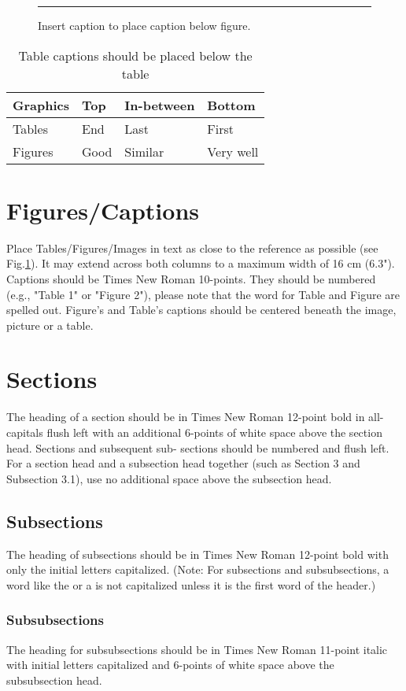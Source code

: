 \documentclass[twoside,twocolumn,10pt]{article}
\begin{document}
\begin{figure}[htb]
    \centering
    \rule{6cm}{3cm}
    \caption{Insert caption to place caption below figure.}
    \label{fig:box}
\end{figure}

\begin{table}[htb]
	\centering
	\begin{tabular}{|l|l|l|l|}
	\hline
	Graphics & Top & In-between & Bottom \\
	\hline
	Tables & End & Last & First \\
	\hline
	Figures & Good & Similar & Very well \\
	\hline
	\end{tabular}
	\caption{Table captions should be placed below the table}
\end{table}

\section{Figures/Captions}
Place Tables/Figures/Images in text as close to the reference as possible (see Fig.\ref{fig:box}). It may extend across both columns to a maximum width of 16 cm (6.3"). Captions should be Times New Roman 10-points.  They should be numbered (e.g., "Table 1" or "Figure 2"), please note that the word for Table and Figure are spelled out. Figure's and Table's captions should be centered beneath the image, picture or a table.

\section{Sections}
The heading of a section should be in Times New Roman 12-point bold in all-capitals flush left with an additional 6-points of white space above the section head.  Sections and subsequent sub- sections should be numbered and flush left. For a section head and a subsection head together (such as Section 3 and Subsection 3.1), use no additional space above the subsection head.

\subsection{Subsections}
The heading of subsections should be in Times New Roman 12-point bold with only the initial letters capitalized. (Note: For subsections and subsubsections, a word like the or a is not capitalized unless it is the first word of the header.)

\subsubsection{Subsubsections}
The heading for subsubsections should be in Times New Roman 11-point italic with initial letters capitalized and 6-points of white space above the subsubsection head.
\end{document}
